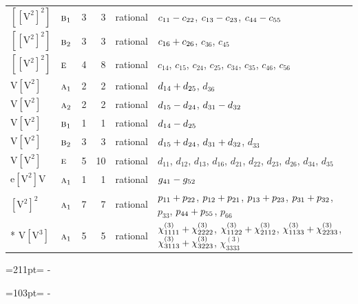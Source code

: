 \documentclass[10pt,a4paper]{article}
\newcommand{\needspace}[1]{\par\penalty-100\begingroup\dimen0=#1\relax\dimen2=\pagegoal
  \advance\dimen2-\pagetotal\ifdim\dimen0>\dimen2\relax\ifdim\dimen2>0pt\vfil\break\fi\fi
  \endgroup}
\numberwithin{equation}{section}
\newcommand{\irr}[1]{\text{\normalfont\scshape #1}}
\newcommand{\jahn}[1]{\mathrm{#1}}
\newlength{\fillwidth}\newlength{\cellwidth}\newlength{\colwidth}
\newcommand{\signbreak}{\penalty100\relax}
\begin{document}
{\begin{longtable}{@{}llrrl>{\RaggedRight\arraybackslash}p{\fillwidth}@{}}
$\jahn{[[V^{2}]^{2}]}$ & $\irr{b}_{1}$ & 3 & 3 & rational & $c_{11} -\signbreak c_{22}$, $c_{13} -\signbreak c_{23}$, $c_{44} -\signbreak c_{55}$\\
$\jahn{[[V^{2}]^{2}]}$ & $\irr{b}_{2}$ & 3 & 3 & rational & $c_{16} +\signbreak c_{26}$, $c_{36}$, $c_{45}$\\
$\jahn{[[V^{2}]^{2}]}$ & $\irr{e}$ & 4 & 8 & rational & $c_{14}$, $c_{15}$, $c_{24}$, $c_{25}$, $c_{34}$, $c_{35}$, $c_{46}$, $c_{56}$\\
$\jahn{V[V^{2}]}$ & $\irr{a}_{1}$ & 2 & 2 & rational & $d_{14} +\signbreak d_{25}$, $d_{36}$\\
$\jahn{V[V^{2}]}$ & $\irr{a}_{2}$ & 2 & 2 & rational & $d_{15} -\signbreak d_{24}$, $d_{31} -\signbreak d_{32}$\\
$\jahn{V[V^{2}]}$ & $\irr{b}_{1}$ & 1 & 1 & rational & $d_{14} -\signbreak d_{25}$\\
$\jahn{V[V^{2}]}$ & $\irr{b}_{2}$ & 3 & 3 & rational & $d_{15} +\signbreak d_{24}$, $d_{31} +\signbreak d_{32}$, $d_{33}$\\
$\jahn{V[V^{2}]}$ & $\irr{e}$ & 5 & 10 & rational & $d_{11}$, $d_{12}$, $d_{13}$, $d_{16}$, $d_{21}$, $d_{22}$, $d_{23}$, $d_{26}$, $d_{34}$, $d_{35}$\\
$\jahn{e[V^{2}]V}$ & $\irr{a}_{1}$ & 1 & 1 & rational & $\mathnormal{g}_{41} -\signbreak \mathnormal{g}_{52}$\\
$\jahn{[V^{2}]^{2}}$ & $\irr{a}_{1}$ & 7 & 7 & rational & $p_{11} +\signbreak p_{22}$, $p_{12} +\signbreak p_{21}$, $p_{13} +\signbreak p_{23}$, $p_{31} +\signbreak p_{32}$, $p_{33}$, $p_{44} +\signbreak p_{55}$, $p_{66}$\\*
$\jahn{V[V^{3}]}$ & $\irr{a}_{1}$ & 5 & 5 & rational & $\chi^{(3)}_{1111} +\signbreak \chi^{(3)}_{2222}$, $\chi^{(3)}_{1122} +\signbreak \chi^{(3)}_{2112}$, $\chi^{(3)}_{1133} +\signbreak \chi^{(3)}_{2233}$, $\chi^{(3)}_{3113} +\signbreak \chi^{(3)}_{3223}$, $\chi^{(3)}_{3333}$\\
\bottomrule\end{longtable}}
\needspace{211pt}
\needspace{103pt}
\end{document}
